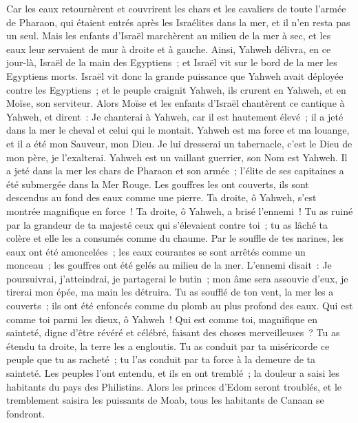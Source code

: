 \begin{multicols}{2}
Car les eaux retournèrent et couvrirent les chars et les cavaliers de toute l'armée de Pharaon, qui étaient entrés après les Israélites dans la mer, et il n'en resta pas un seul.
Mais les enfants d'Israël marchèrent au milieu de la mer à sec, et les eaux leur servaient de mur à droite et à gauche.
Ainsi, Yahweh délivra, en ce jour-là, Israël de la main des Egyptiens~; et Israël vit sur le bord de la mer les Egyptiens morts.
Israël vit donc la grande puissance que Yahweh avait déployée contre les Egyptiens~; et le peuple craignit Yahweh, ils crurent en Yahweh, et en Moïse, son serviteur.
\VerseOne{}Alors Moïse et les enfants d'Israël chantèrent ce cantique à Yahweh, et dirent~: Je chanterai à Yahweh, car il est hautement élevé~; il a jeté dans la mer le cheval et celui qui le montait.
Yahweh est ma force et ma louange, et il a été mon Sauveur, mon Dieu. Je lui dresserai un tabernacle, c'est le Dieu de mon père, je l'exalterai.
Yahweh est un vaillant guerrier, son Nom est Yahweh.
Il a jeté dans la mer les chars de Pharaon et son armée~; l'élite de ses capitaines a été submergée dans la Mer Rouge.
Les gouffres les ont couverts, ils sont descendus au fond des eaux comme une pierre.
Ta droite, ô Yahweh, s'est montrée magnifique en force~! Ta droite, ô Yahweh, a brisé l'ennemi~!
Tu as ruiné par la grandeur de ta majesté ceux qui s'élevaient contre toi~; tu as lâché ta colère et elle les a consumés comme du chaume.
Par le souffle de tes narines, les eaux ont été amoncelées~; les eaux courantes se sont arrêtés comme un monceau~; les gouffres ont été gelés au milieu de la mer.
L'ennemi disait~: Je poursuivrai, j'atteindrai, je partagerai le butin~; mon âme sera assouvie d'eux, je tirerai mon épée, ma main les détruira.
Tu as soufflé de ton vent, la mer les a couverts~; ils ont été enfoncés comme du plomb au plus profond des eaux.
Qui est comme toi parmi les dieux, ô Yahweh~! Qui est comme toi, magnifique en sainteté, digne d'être révéré et célébré, faisant des choses merveilleuses~?
Tu as étendu ta droite, la terre les a engloutis.
Tu as conduit par ta miséricorde ce peuple que tu as racheté~; tu l'as conduit par ta force à la demeure de ta sainteté.
Les peuples l'ont entendu, et ils en ont tremblé~; la douleur a saisi les habitants du pays des Philistins.
Alors les princes d'Edom seront troublés, et le tremblement saisira les puissants de Moab, tous les habitants de Canaan se fondront.

\end{multicols}

